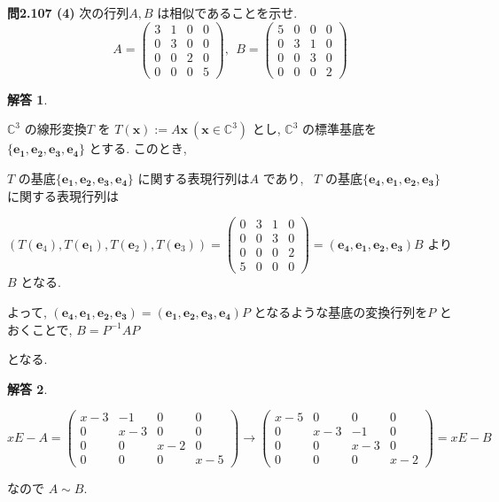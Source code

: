 \documentclass{jsarticle}
\newtheorem{answer}{解答}
\begin{document}
\begin{itembox}[l]{\textbf{問2.107 (4)}}
次の行列$A, B$ は相似であることを示せ. \\
$$
A = \begin{pmatrix} 3 & 1 & 0 & 0 \\ 0 & 3 & 0 & 0 \\ 0 & 0 & 2 & 0 \\ 0 & 0 & 0 & 5
\end{pmatrix}, \ \ B = \begin{pmatrix} 5 & 0 & 0 & 0 \\ 0 & 3 & 1 & 0 \\ 0 & 0 & 3 & 0 \\ 0 & 0 & 0 & 2 \end{pmatrix}$$
\end{itembox}

\begin{answer}
\end{answer}

$\mathbb{C}^3$ の線形変換$T$ を $T(\bm{x}) := A \bm{x} \ (\bm{x} \in \mathbb{C}^3)$ とし, $\mathbb{C}^3$ の標準基底を $\{\bm{e_1}, \bm{e_2}, \bm{e_3}, \bm{e_4}\}$ とする. このとき, 

$T$ の基底$\{\bm{e_1}, \bm{e_2}, \bm{e_3}, \bm{e_4}\}$ に関する表現行列は$A$ であり, \ 
$T$ の基底$\{\bm{e_4}, \bm{e_1}, \bm{e_2}, \bm{e_3}\}$ に関する表現行列は

$\left( T(\bm{e}_4), T(\bm{e}_1), T(\bm{e}_2), T(\bm{e}_3) \right) = 
\begin{pmatrix}
0 & 3 & 1 & 0 \\ 0 & 0 & 3 & 0 \\ 0 & 0 & 0 & 2 \\ 5 & 0 & 0 & 0
\end{pmatrix}
= (\bm{e_4}, \bm{e_1}, \bm{e_2}, \bm{e_3}) B$ より$B$ となる.

よって, $(\bm{e_4}, \bm{e_1}, \bm{e_2}, \bm{e_3}) = (\bm{e_1}, \bm{e_2}, \bm{e_3}, \bm{e_4}) P$ となるような基底の変換行列を$P$ とおくことで, $B = P^{-1} A P$ 

となる.

\bigskip
\bigskip

\begin{answer}
\end{answer}

$xE - A = \begin{pmatrix} x-3 & -1 & 0 & 0 \\ 0 & x-3 & 0 & 0 \\ 0 & 0 & x-2 & 0 \\ 0 & 0 & 0 & x-5 \end{pmatrix} \longrightarrow 
\begin{pmatrix}
x-5 & 0 & 0 & 0 \\ 0 & x-3 & -1 & 0 \\ 0 & 0 & x-3 & 0 \\ 0 & 0 & 0 & x-2
\end{pmatrix}
= xE - B$

\bigskip

なので $A \sim B$.
\end{document}
